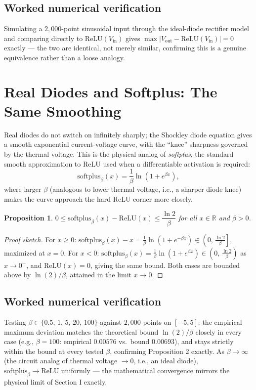 \documentclass[10pt,journal,compsoc]{IEEEtran}
\newtheorem{proposition}{Proposition}
\begin{document}
\subsection{Worked numerical verification}
Simulating a $2{,}000$-point sinusoidal input through the ideal-diode rectifier model and comparing directly to $\mathrm{ReLU}(V_{\mathrm{in}})$ gives $\max|V_{\mathrm{out}}-\mathrm{ReLU}(V_{\mathrm{in}})| = 0$ exactly — the two are identical, not merely similar, confirming this is a genuine equivalence rather than a loose analogy.

\section{Real Diodes and Softplus: The Same Smoothing}
Real diodes do not switch on infinitely sharply; the Shockley diode equation gives a smooth exponential current-voltage curve, with the ``knee'' sharpness governed by the thermal voltage. This is the physical analog of \emph{softplus}, the standard smooth approximation to ReLU used when a differentiable activation is required:
\begin{equation}
    \mathrm{softplus}_\beta(x) = \frac{1}{\beta}\ln\!\left(1+e^{\beta x}\right),
\end{equation}
where larger $\beta$ (analogous to lower thermal voltage, i.e., a sharper diode knee) makes the curve approach the hard ReLU corner more closely.

\begin{proposition}
$0 \le \mathrm{softplus}_\beta(x) - \mathrm{ReLU}(x) \le \dfrac{\ln 2}{\beta}$ for all $x\in\mathbb R$ and $\beta>0$.
\end{proposition}
\begin{proof}[Proof sketch]
For $x\ge 0$: $\mathrm{softplus}_\beta(x) - x = \frac1\beta\ln(1+e^{-\beta x}) \in \left(0,\,\frac{\ln 2}{\beta}\right]$, maximized at $x=0$. For $x<0$: $\mathrm{softplus}_\beta(x) = \frac1\beta\ln(1+e^{\beta x}) \in \left(0,\,\frac{\ln 2}{\beta}\right)$ as $x\to0^-$, and $\mathrm{ReLU}(x)=0$, giving the same bound. Both cases are bounded above by $\ln(2)/\beta$, attained in the limit $x\to0$.
\end{proof}

\subsection{Worked numerical verification}
Testing $\beta\in\{0.5,\,1,\,5,\,20,\,100\}$ against $2{,}000$ points on $[-5,5]$: the empirical maximum deviation matches the theoretical bound $\ln(2)/\beta$ closely in every case (e.g., $\beta=100$: empirical $0.00576$ vs.\ bound $0.00693$), and stays strictly within the bound at every tested $\beta$, confirming Proposition 2 exactly. As $\beta\to\infty$ (the circuit analog of thermal voltage $\to0$, i.e., an ideal diode), $\mathrm{softplus}_\beta\to\mathrm{ReLU}$ uniformly — the mathematical convergence mirrors the physical limit of Section I exactly.
\end{document}
